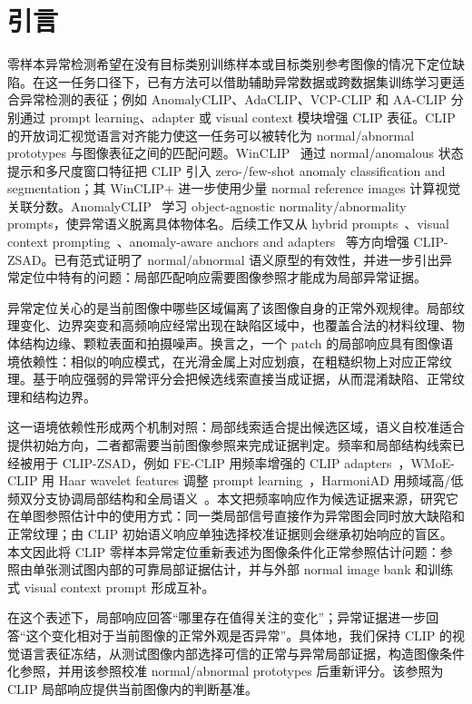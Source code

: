 \section{引言}

零样本异常检测希望在没有目标类别训练样本或目标类别参考图像的情况下定位缺陷。在这一任务口径下，已有方法可以借助辅助异常数据或跨数据集训练学习更适合异常检测的表征；例如 AnomalyCLIP、AdaCLIP、VCP-CLIP 和 AA-CLIP 分别通过 prompt learning、adapter 或 visual context 模块增强 CLIP 表征。CLIP~\cite{radford2021clip} 的开放词汇视觉语言对齐能力使这一任务可以被转化为 normal/abnormal prototypes 与图像表征之间的匹配问题。WinCLIP~\cite{jeong2023winclip} 通过 normal/anomalous 状态提示和多尺度窗口特征把 CLIP 引入 zero-/few-shot anomaly classification and segmentation；其 WinCLIP+ 进一步使用少量 normal reference images 计算视觉关联分数。AnomalyCLIP~\cite{zhou2024anomalyclip} 学习 object-agnostic normality/abnormality prompts，使异常语义脱离具体物体名。后续工作又从 hybrid prompts~\cite{cao2024adaclip}、visual context prompting~\cite{qu2024vcpclip}、anomaly-aware anchors and adapters~\cite{ma2025aaclip} 等方向增强 CLIP-ZSAD。已有范式证明了 normal/abnormal 语义原型的有效性，并进一步引出异常定位中特有的问题：局部匹配响应需要图像参照才能成为局部异常证据。

异常定位关心的是当前图像中哪些区域偏离了该图像自身的正常外观规律。局部纹理变化、边界突变和高频响应经常出现在缺陷区域中，也覆盖合法的材料纹理、物体结构边缘、颗粒表面和拍摄噪声。换言之，一个 patch 的局部响应具有图像语境依赖性：相似的响应模式，在光滑金属上对应划痕，在粗糙织物上对应正常纹理。基于响应强弱的异常评分会把候选线索直接当成证据，从而混淆缺陷、正常纹理和结构边界。

这一语境依赖性形成两个机制对照：局部线索适合提出候选区域，语义自校准适合提供初始方向，二者都需要当前图像参照来完成证据判定。频率和局部结构线索已经被用于 CLIP-ZSAD，例如 FE-CLIP 用频率增强的 CLIP adapters~\cite{gong2025feclip}，WMoE-CLIP 用 Haar wavelet features 调整 prompt learning~\cite{chen2026wmoeclip}，HarmoniAD 用频域高/低频双分支协调局部结构和全局语义~\cite{zhang2026harmoniad}。本文把频率响应作为候选证据来源，研究它在单图参照估计中的使用方式：同一类局部信号直接作为异常图会同时放大缺陷和正常纹理；由 CLIP 初始语义响应单独选择校准证据则会继承初始响应的盲区。本文因此将 CLIP 零样本异常定位重新表述为图像条件化正常参照估计问题：参照由单张测试图内部的可靠局部证据估计，并与外部 normal image bank 和训练式 visual context prompt 形成互补。

在这个表述下，局部响应回答“哪里存在值得关注的变化”；异常证据进一步回答“这个变化相对于当前图像的正常外观是否异常”。具体地，我们保持 CLIP 的视觉语言表征冻结，从测试图像内部选择可信的正常与异常局部证据，构造图像条件化参照，并用该参照校准 normal/abnormal prototypes 后重新评分。该参照为 CLIP 局部响应提供当前图像内的判断基准。

